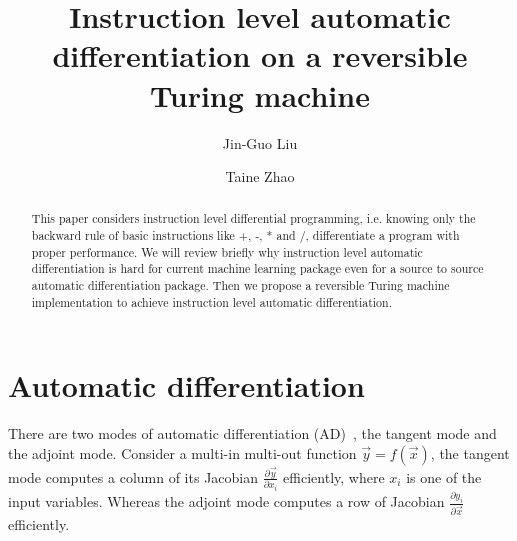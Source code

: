 \documentclass[aps,twocolumn,longbibliography,english,superscriptaddress,prr]{revtex4-1}
\newcommand{\<}{\langle}
\renewcommand{\>}{\rangle}
\newcommand{\vx}{{\vec x}}
\newcommand{\vy}{{\vec y}}
\theoremstyle{definition}\newtheorem{definition}{\textit{Definition}}
\begin{document}
\title{Instruction level automatic differentiation on a reversible Turing machine}


\author{Jin-Guo Liu}

\author{Taine Zhao}

\begin{abstract}
    This paper considers instruction level differential programming, i.e. knowing only the backward rule of basic instructions like +, -, * and /, differentiate a program with proper performance. We will review briefly why instruction level automatic differentiation is hard for current machine learning package even for a source to source automatic differentiation package. Then we propose a reversible Turing machine implementation to achieve instruction level automatic differentiation.
\end{abstract}


\maketitle

\section{Automatic differentiation}
    There are two modes of automatic differentiation (AD)~\cite{Hascoet2013}, the tangent mode and the adjoint mode.
    Consider a multi-in multi-out function $\vy = f(\vx)$, the tangent mode computes a column of its Jacobian $\frac{\partial \vy}{\partial x_i}$ efficiently, where $x_i$ is one of the input variables.
Whereas the adjoint mode computes a row of Jacobian $\frac{\partial y_i}{\partial \vec{x}}$ efficiently.
\end{document}

